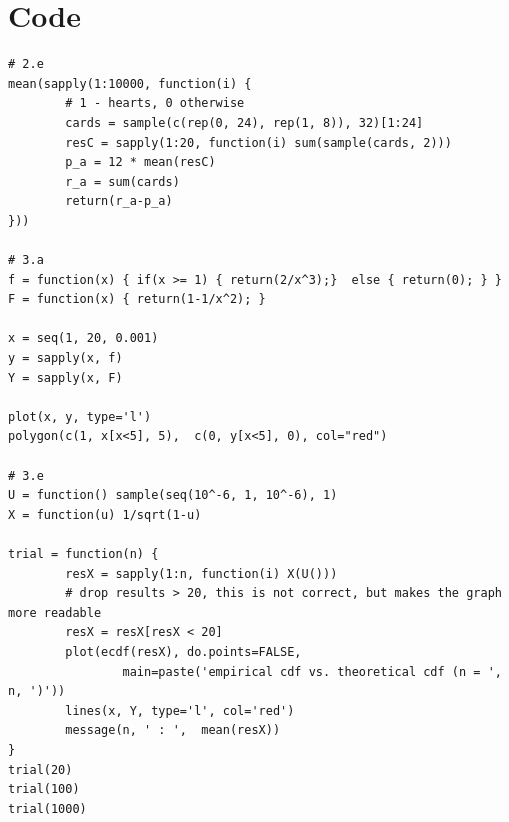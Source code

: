 \documentclass[a4paper]{article}
\begin{document}
\section*{Code}
\begin{lstlisting}
# 2.e
mean(sapply(1:10000, function(i) {
        # 1 - hearts, 0 otherwise
        cards = sample(c(rep(0, 24), rep(1, 8)), 32)[1:24]
        resC = sapply(1:20, function(i) sum(sample(cards, 2)))
        p_a = 12 * mean(resC)
        r_a = sum(cards)
        return(r_a-p_a)
}))

# 3.a
f = function(x) { if(x >= 1) { return(2/x^3);}  else { return(0); } }
F = function(x) { return(1-1/x^2); }

x = seq(1, 20, 0.001)
y = sapply(x, f)
Y = sapply(x, F)

plot(x, y, type='l')
polygon(c(1, x[x<5], 5),  c(0, y[x<5], 0), col="red")

# 3.e
U = function() sample(seq(10^-6, 1, 10^-6), 1)
X = function(u) 1/sqrt(1-u)

trial = function(n) {
        resX = sapply(1:n, function(i) X(U()))
        # drop results > 20, this is not correct, but makes the graph more readable
        resX = resX[resX < 20]
        plot(ecdf(resX), do.points=FALSE,
                main=paste('empirical cdf vs. theoretical cdf (n = ', n, ')'))
        lines(x, Y, type='l', col='red')
        message(n, ' : ',  mean(resX))
}
trial(20)
trial(100)
trial(1000)
\end{lstlisting}
\end{document}
